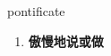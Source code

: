 
\begin{frame}
{\huge pontificate}
\begin{center}
\begin{enumerate}\Large
  \item \textbf{傲慢地说或做}
\end{enumerate}
\end{center}
\end{frame}
